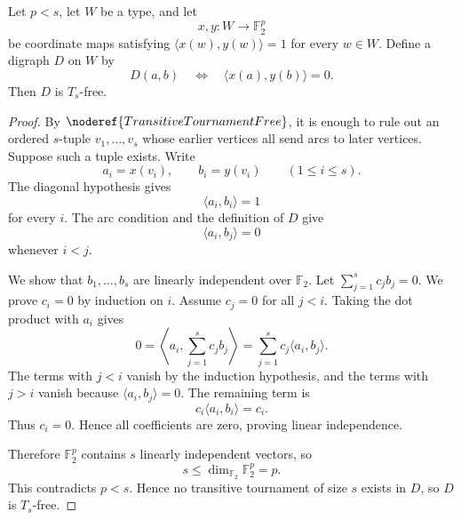 \begin{helper}
Let \(p<s\), let \(W\) be a type, and let
\[
  x,y:W\to\mathbb F_2^p
\]
be coordinate maps satisfying \(\langle x(w),y(w)\rangle=1\) for every \(w\in W\).
Define a digraph \(D\) on \(W\) by
\[
  D(a,b)\quad\Longleftrightarrow\quad \langle x(a),y(b)\rangle=0.
\]
Then \(D\) is \(T_s\)-free.
\end{helper}
\begin{proof}
By \(\noderef{TransitiveTournamentFree}\), it is enough to rule out an ordered
\(s\)-tuple \(v_1,\ldots,v_s\) whose earlier vertices all send arcs to later
vertices. Suppose such a tuple exists. Write
\[
  a_i=x(v_i),\qquad b_i=y(v_i)\qquad(1\le i\le s).
\]
The diagonal hypothesis gives
\[
  \langle a_i,b_i\rangle=1
\]
for every \(i\). The arc condition and the definition of \(D\) give
\[
  \langle a_i,b_j\rangle=0
\]
whenever \(i<j\).

We show that \(b_1,\ldots,b_s\) are linearly independent over \(\mathbb F_2\).
Let \(\sum_{j=1}^s c_j b_j=0\). We prove \(c_i=0\) by induction on \(i\).
Assume \(c_j=0\) for all \(j<i\). Taking the dot product with \(a_i\) gives
\[
  0=\left\langle a_i,\sum_{j=1}^s c_j b_j\right\rangle
   =\sum_{j=1}^s c_j\langle a_i,b_j\rangle.
\]
The terms with \(j<i\) vanish by the induction hypothesis, and the terms with
\(j>i\) vanish because \(\langle a_i,b_j\rangle=0\). The remaining term is
\[
  c_i\langle a_i,b_i\rangle=c_i.
\]
Thus \(c_i=0\). Hence all coefficients are zero, proving linear independence.

Therefore \(\mathbb F_2^p\) contains \(s\) linearly independent vectors, so
\[
  s\le \dim_{\mathbb F_2}\mathbb F_2^p=p.
\]
This contradicts \(p<s\). Hence no transitive tournament of size \(s\) exists
in \(D\), so \(D\) is \(T_s\)-free.
\end{proof}
